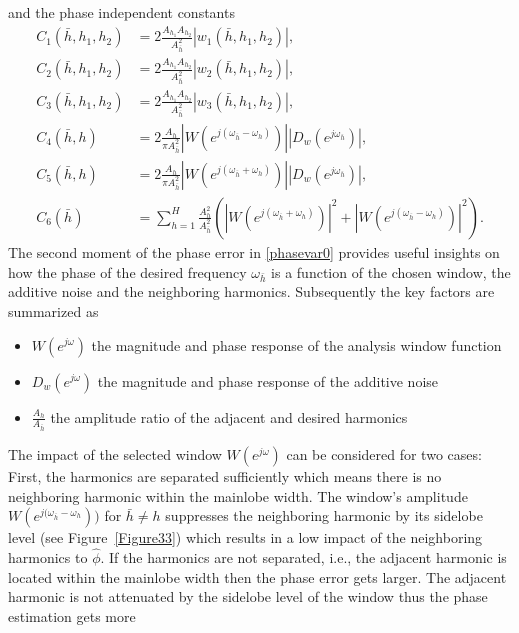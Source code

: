 and the phase independent constants 
\begin{equation}
\begin{split}
C_1(\bar{h},h_1,h_2)&=2\frac{A_{h_1} A_{h_2}}{A^2_{\bar{h}}}|w_1(\bar{h},h_1,h_2)|,\\
C_2(\bar{h},h_1,h_2)&=2\frac{A_{h_1} A_{h_2}}{A^2_{\bar{h}}}|w_2(\bar{h},h_1,h_2)|,\\
C_3(\bar{h},h_1,h_2)&=2\frac{A_{h_1} A_{h_2}}{A^2_{\bar{h}}}|w_3(\bar{h},h_1,h_2)|,\\
C_4(\bar{h},h)&=2\frac{A_h}{\pi A^2_{\bar{h}}}|W(e^{j(\omega_{\bar{h}}-\omega_h)})||D_w(e^{j\omega_{\bar{h}}})|,\\
C_5(\bar{h},h)&=2\frac{A_h}{\pi A^2_{\bar{h}}}|W(e^{j(\omega_{\bar{h}}+\omega_h)})||D_w(e^{j\omega_{\bar{h}}})|,\\
C_6(\bar{h})&=\sum_{h=1}^H \frac{A_h^2}{A_{\bar{h}}^2}\left( |W(e^{j(\omega_{\bar{h}}+\omega_{{h}})})|^2+|W(e^{j(\omega_{\bar{h}}-\omega_{{h}})})|^2 \right).
\end{split}
\end{equation}
The second moment of the phase error in \eqref{phasevar0} provides useful insights on how the phase of the desired frequency $\omega_{\bar{h}}$ is a function of the chosen window, the additive noise and the neighboring harmonics. Subsequently the key factors are summarized as
\begin{itemize}
	\item $W(e^{j\omega})$ the magnitude and phase response of the analysis window function
	\item $D_w(e^{j\omega})$ the magnitude and phase response of the additive noise
	\item $\frac{A_h}{A_{\bar{h}}}$ the amplitude ratio of the adjacent and desired harmonics
\end{itemize}
The impact of the selected window $W(e^{j\omega})$ can be considered for two cases: First, the harmonics are separated sufficiently which means there is no neighboring harmonic within the mainlobe width. The window's amplitude $W(e^{j(\omega_{\bar{h}}-\omega_h}))$ for $\bar{h}\neq h$ suppresses the neighboring harmonic by its sidelobe level (see Figure~\ref{Figure33}) which results in a low impact of the neighboring harmonics to $\hat{\phi}$. If the harmonics are not separated, i.e., the adjacent harmonic is located within the mainlobe width then the phase error gets larger. The adjacent harmonic is not attenuated by the sidelobe level of the window thus the phase estimation gets more 
